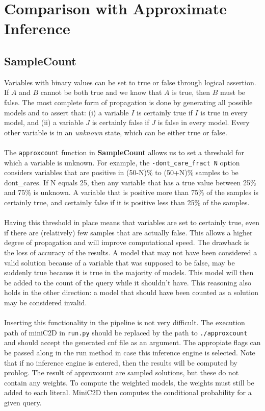 \section{Comparison with Approximate Inference}

\subsection{SampleCount}

Variables with binary values can be set to true or false through logical assertion. If $A$ and $B$ cannot be both true and we know that $A$ is true, then $B$ must be false. The most complete form of propagation is done by generating all possible models and to assert that: (i) a variable $I$ is certainly true if $I$ is true in every model, and (ii) a variable $J$ is certainly false if $J$ is false in every model. Every other variable is in an \textit{unknown} state, which can be either true or false.
\\\\
The \texttt{approxcount} function in \textbf{SampleCount} allows us to set a threshold for which a variable is unknown. For example, the \texttt{-dont\_care\_fract N} option considers variables that are positive in (50-N)\% to (50+N)\% samples to be dont\_cares. If N equals 25, then any variable that has a true value between 25\% and 75\% is unknown. A variable that is positive more than 75\% of the samples is certainly true, and certainly false if it is positive less than 25\% of the samples.
\\\\
Having this threshold in place means that variables are set to certainly true, even if there are (relatively) few samples that are actually false. This allows a higher degree of propagation and will improve computational speed. The drawback is the loss of accuracy of the results. A model that may not have been considered a valid solution because of a variable that was supposed to be false, may be suddenly true because it is true in the majority of models. This model will then be added to the count of the query while it shouldn't have. This reasoning also holds in the other direction: a model that should have been counted as a solution may be considered invalid.
\\\\
Inserting this functionality in the pipeline is not very difficult. The execution path of miniC2D in \texttt{run.py} should be replaced by the path to \texttt{./approxcount} and should accept the generated cnf file as an argument. The appropiate flags can be passed along in the run method in case this inference engine is selected. Note that if no inference engine is entered, then the results will be computed by problog. The result of approxcount are sampled solutions, but these do not contain any weights. To compute the weighted models, the weights must still be added to each literal. MiniC2D then computes the conditional probability for a given query.


